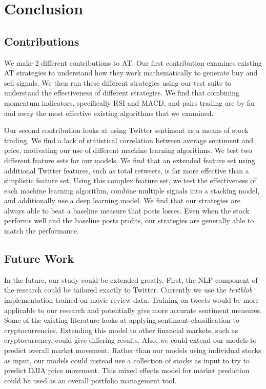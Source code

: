 \documentclass[../thesis.tex]{subfiles}
\begin{document}
\chapter{Conclusion}
\label{ch:conclusion}

\section{Contributions}
We make 2 different contributions to AT. Our first contribution examines existing AT strategies to understand how they work mathematically to generate buy and sell signals. We then run these different strategies using our test suite to understand the effectiveness of different strategies. We find that combining momentum indicators, specifically RSI and MACD, and pairs trading are by far and away the most effective existing algorithms that we examined.

Our second contribution looks at using Twitter sentiment as a means of stock trading. We find a lack of statistical correlation between average sentiment and price, motivating our use of different machine learning algorithms. We test two different feature sets for our models. We find that an extended feature set using additional Twitter features, such as total retweets, is far more effective than a simplistic feature set. Using this complex feature set, we test the effectiveness of each machine learning algorithm, combine multiple signals into a stacking model, and additionally use a deep learning model. We find that our strategies are always able to beat a baseline measure that posts losses. Even when the stock performs well and the baseline posts profits, our strategies are generally able to match the performance. 

\section{Future Work}
In the future, our study could be extended greatly. First, the NLP component of the research could be tailored exactly to Twitter. Currently we use the \textit{textblob} implementation trained on movie review data. Training on tweets would be more applicable to our research and potentially give more accurate sentiment measures. Some of the existing literature looks at applying sentiment classification to cryptocurrencies. Extending this model to other financial markets, such as cryptocurrency, could give differing results. Also, we could extend our models to predict overall market movement. Rather than our models using individual stocks as input, our models could instead use a collection of stocks as input to try to predict DJIA price movement. This mixed effects model for market prediction could be used as an overall portfolio management tool. 
\end{document}
